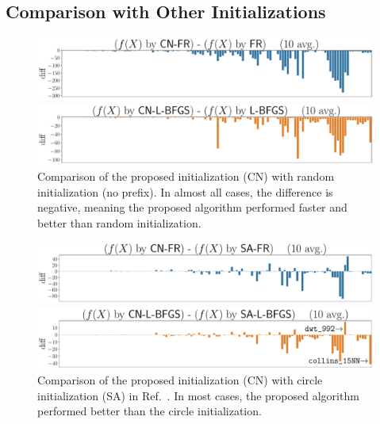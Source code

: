 \documentclass[dvipdfmx,10pt,journal,compsoc]{IEEEtran}
\begin{document}
\subsection{Comparison with Other Initializations}\label{ssec:exprAll}

\begin{figure}[t]
  \centering
  \begin{minipage}{\columnwidth}
    \centering
    \includegraphics[width=\columnwidth]{overall/plot/diff_FR_50.pdf}
  \end{minipage}
  \begin{minipage}{\columnwidth}
    \centering
    \includegraphics[width=\columnwidth]{overall/plot/diff_L-BFGS_50.pdf}
  \end{minipage}
  \caption{
    Comparison of the proposed initialization (\textsf{CN}) with random initialization (no prefix).
    In almost all cases, the difference is negative, meaning the proposed algorithm performed faster and better than random initialization.
  }
  \label{fig:overall}
\end{figure}
\begin{figure}[!t]
  \centering
  \begin{minipage}{\columnwidth}
    \centering
    \includegraphics[width=\columnwidth]{circle/plot/diff_FR_50.pdf}
  \end{minipage}
  \begin{minipage}{\columnwidth}
    \centering
    \includegraphics[width=\columnwidth]{circle/plot/diff_L-BFGS_50.pdf}
  \end{minipage}
  \caption{
    Comparison of the proposed initialization (\textsf{CN}) with circle initialization (\textsf{SA}) in Ref.~\cite{ghassemitoosiSimulatedAnnealingPreProcessing2016}.
    In most cases, the proposed algorithm performed better than the circle initialization.
  }
  \label{fig:diff}
\end{figure}
\end{document}
